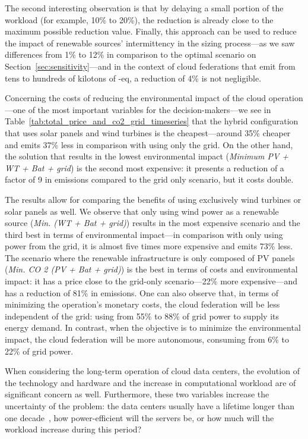 The second interesting observation is that by delaying a small portion of the workload (for example, 10\% to 20\%), the reduction is already close to the maximum possible reduction value. Finally, this approach can be used to reduce the impact of renewable sources' intermittency in the sizing process---as we saw differences from 1\% to 12\% in comparison to the optimal scenario on Section~\ref{sec:sensitivity}---and in the context of cloud federations that emit from tens to hundreds of kilotons of -eq, a reduction of 4\% is not negligible.

Concerning the costs of reducing the environmental impact of the cloud operation---one of the most important variables for the decision-makers---we see in Table~\ref {tab:total_price_and_co2_grid_timeseries} that the hybrid configuration that uses solar panels and wind turbines is the cheapest---around 35\% cheaper and emits 37\% less  in comparison with using only the grid. On the other hand, the solution that results in the lowest environmental impact (\textit{Minimum  PV + WT + Bat + grid}) is the second most expensive: it presents a reduction of a factor of 9 in  emissions compared to the grid only scenario, but it costs double. 

The results allow for comparing the benefits of using exclusively wind turbines or solar panels as well. We observe that only using wind power as a renewable source (\textit{Min.  (WT + Bat + grid)}) results in the most expensive scenario and the third best in terms of environmental impact---in comparison with only using power from the grid, it is almost five times more expensive and emits 73\% less. The scenario where the renewable infrastructure is only composed of PV panels (\textit{Min. CO 2 (PV + Bat + grid)}) is the best in terms of costs and environmental impact: it has a price close to the grid-only scenario---22\% more expensive---and has a reduction of 81\% in  emissions. One can also observe that, in terms of minimizing the operation's monetary costs, the cloud federation will be less independent of the grid: using from 55\% to 88\% of grid power to supply its energy demand. In contrast, when the objective is to minimize the environmental impact, the cloud federation will be more autonomous, consuming from 6\% to 22\% of grid power.

When considering the long-term operation of cloud data centers, the evolution of the technology and hardware and the increase in computational workload are of significant concern as well. Furthermore, these two variables increase the uncertainty of the problem: the data centers usually have a lifetime longer than one decade~\cite{datacenter_as_computer}, how power-efficient will the servers be, or how much will the workload increase during this period? 

